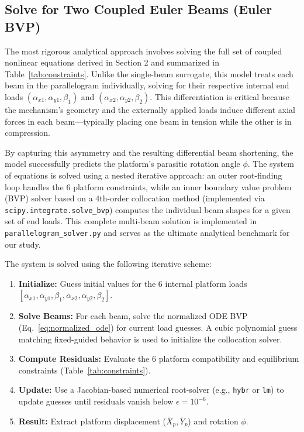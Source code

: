 \documentclass[colorlinks,upint,subscriptcorrection,varvw,hyphenate,balance]{asmeconf} %
\begin{document}
\subsection{Solve for Two Coupled Euler Beams (Euler BVP)}
\label{sec:euler}
The most rigorous analytical approach involves solving the full set of coupled nonlinear equations derived in Section 2 and summarized in Table~\ref{tab:constraints}. Unlike the single-beam surrogate, this model treats each beam in the parallelogram individually, solving for their respective internal end loads $(\alpha_{x1}, \alpha_{y1}, \beta_1)$ and $(\alpha_{x2}, \alpha_{y2}, \beta_2)$. This differentiation is critical because the mechanism's geometry and the externally applied loads induce different axial forces in each beam—typically placing one beam in tension while the other is in compression. 

By capturing this asymmetry and the resulting differential beam shortening, the model successfully predicts the platform's parasitic rotation angle $\phi$. The system of equations is solved using a nested iterative approach: an outer root-finding loop handles the 6 platform constraints, while an inner boundary value problem (BVP) solver based on a 4th-order collocation method (implemented via \texttt{scipy.integrate.solve\_bvp}) computes the individual beam shapes for a given set of end loads. This complete multi-beam solution is implemented in \texttt{parallelogram\_solver.py} and serves as the ultimate analytical benchmark for our study.

The system is solved using the following iterative scheme:
\begin{enumerate}
    \item \textbf{Initialize:} Guess initial values for the 6 internal platform loads $[\alpha_{x1}, \alpha_{y1}, \beta_1, \alpha_{x2}, \alpha_{y2}, \beta_2]$.
    \item \textbf{Solve Beams:} For each beam, solve the normalized ODE BVP (Eq.~\eqref{eq:normalized_ode}) for current load guesses. A cubic polynomial guess matching fixed-guided behavior is used to initialize the collocation solver.
    \item \textbf{Compute Residuals:} Evaluate the 6 platform compatibility and equilibrium constraints (Table~\ref{tab:constraints}).
    \item \textbf{Update:} Use a Jacobian-based numerical root-solver (e.g., \texttt{hybr} or \texttt{lm}) to update guesses until residuals vanish below $\epsilon = 10^{-6}$.
    \item \textbf{Result:} Extract platform displacement ($\bar{X}_p, \bar{Y}_p$) and rotation $\phi$.
\end{enumerate}
\end{document}
